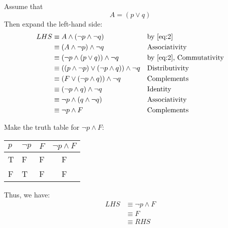 Assume that
\begin{equation}
\label{eq:2}
  A = (p \lor q)
\end{equation}
Then expand the left-hand side:
\begin{align*}
  LHS
  & \equiv A \land (\neg p \land \neg q)
  && \text{by \eqref{eq:2}} \\
  & \equiv (A \land \neg p) \land \neg q
  && \text{Associativity} \\
  & \equiv (\neg p \land (p \lor q)) \land \neg q
  && \text{by \eqref{eq:2}, Commutativity} \\
  & \equiv ((p \land \neg p) \lor (\neg p \land q)) \land \neg q
  && \text{Distributivity} \\
  & \equiv (F \lor (\neg p \land q)) \land \neg q
  && \text{Complements} \\
  & \equiv (\neg p \land q) \land \neg q
  && \text{Identity} \\
  & \equiv \neg p \land (q \land \neg q)
  && \text{Associativity}  \\
  & \equiv \neg p \land F && \text{Complements}
\end{align*}

Make the truth table for \(\neg p \land F\):
\begin{center}
\begin{tabular}{|l|l|l|c|}
  \hline
  \(p\) & \(\neg p\) & \(F\) & \(\neg p \land F\) \\
  \hline
  T & F & F & F \\
  F & T & F & F \\
  \hline
\end{tabular}
\end{center}
Thus, we have:
\begin{align*}
  LHS
  & \equiv \neg p \land F \\
  & \equiv F \\
  & \equiv RHS
\end{align*}
